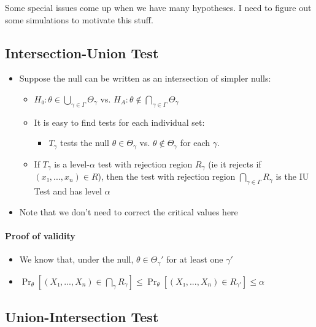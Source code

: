 Some special issues come up when we have many hypotheses.  I need to
figure out some simulations to motivate this stuff.

\subsection{Intersection-Union Test}

\begin{itemize}
\item Suppose the null can be written as an intersection of simpler nulls:
\begin{itemize}
\item $H₀: θ ∈ ⋃_{γ ∈ Γ} Θ_γ$ vs.  $H_A: θ ∉ ⋂_{γ ∈ Γ} Θ_γ$
\item It is easy to find tests for each individual set:
\begin{itemize}
\item $T_γ$ tests the null $θ ∈ Θ_γ$ vs. $θ ∉ Θ_γ$ for each $γ$.
\end{itemize}
\item If $T_γ$ is a level-$α$ test with rejection region $R_γ$ (ie it
  rejects if $(x₁,...,x_n) ∈ R$), then the test with rejection region
  $⋂_{γ ∈ Γ} R_γ$ is the IU Test and has level $α$
\end{itemize}
\item Note that we don't need to correct the critical values here
\end{itemize}

\paragraph{Proof of validity}
\begin{itemize}
\item We know that, under the null, $θ ∈ Θ_γ'$ for at least one $γ'$
\item $\Pr_θ[(X₁,...,X_n) ∈ ⋂_γ R_γ] ≤ \Pr_θ[(X₁,..., X_n) ∈ R_{γ'}] ≤ α$
\end{itemize}

\subsection{Union-Intersection Test}

